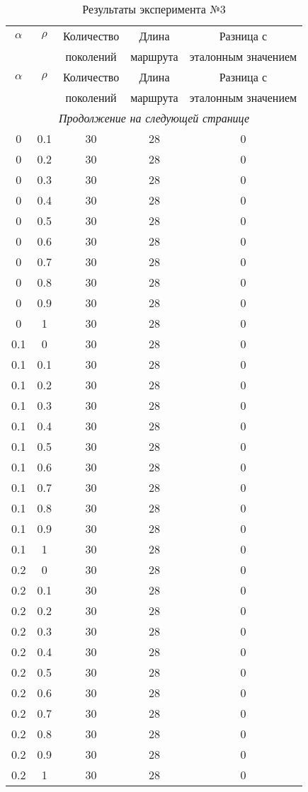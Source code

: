 \begin{longtable}{|c|c|c|c|c|}
	\caption{Результаты эксперимента №3}\label{table_3}\\
	\hline
	
	$\alpha$ & $\rho$ & Количество  & Длина & Разница с  \\
	&& поколений & маршрута & эталонным значением\\
	\hline
	\endfirsthead
	
	\hline
	$\alpha$ & $\rho$ & Количество  & Длина & Разница с  \\
	&& поколений & маршрута & эталонным значением\\
	\hline
	\endhead
	
	\hline
	\multicolumn{5}{c}{\textit{Продолжение на следующей странице}}
	\endfoot
	\hline
	\endlastfoot
	
	0& 0& 30& 28& 0\\
	0& 0.1& 30& 28& 0\\
	0& 0.2& 30& 28& 0\\
	0& 0.3& 30& 28& 0\\
	0& 0.4& 30& 28& 0\\
	0& 0.5& 30& 28& 0\\
	0& 0.6& 30& 28& 0\\
	0& 0.7& 30& 28& 0\\
	0& 0.8& 30& 28& 0\\
	0& 0.9& 30& 28& 0\\
	0& 1& 30& 28& 0\\
	\hline
	
	0.1& 0& 30& 28& 0\\
	0.1& 0.1& 30& 28& 0\\
	0.1& 0.2& 30& 28& 0\\
	0.1& 0.3& 30& 28& 0\\
	0.1& 0.4& 30& 28& 0\\
	0.1& 0.5& 30& 28& 0\\
	0.1& 0.6& 30& 28& 0\\
	0.1& 0.7& 30& 28& 0\\
	0.1& 0.8& 30& 28& 0\\
	0.1& 0.9& 30& 28& 0\\
	0.1& 1& 30& 28& 0\\
	\hline
	
	0.2& 0& 30& 28& 0\\
	0.2& 0.1& 30& 28& 0\\
	0.2& 0.2& 30& 28& 0\\
	0.2& 0.3& 30& 28& 0\\
	0.2& 0.4& 30& 28& 0\\
	0.2& 0.5& 30& 28& 0\\
	0.2& 0.6& 30& 28& 0\\
	0.2& 0.7& 30& 28& 0\\
	0.2& 0.8& 30& 28& 0\\
	0.2& 0.9& 30& 28& 0\\
	0.2& 1& 30& 28& 0\\
	\hline
	

\end{longtable}
